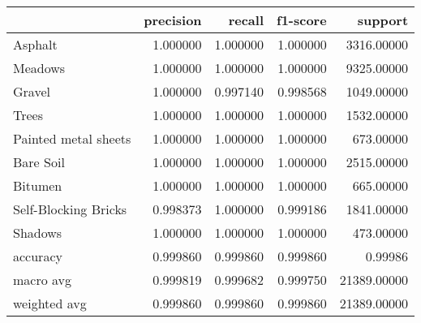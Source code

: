 \begin{tabular}{lrrrr}
\toprule
{} &  precision &    recall &  f1-score &      support \\
\midrule
Asphalt              &   1.000000 &  1.000000 &  1.000000 &   3316.00000 \\
Meadows              &   1.000000 &  1.000000 &  1.000000 &   9325.00000 \\
Gravel               &   1.000000 &  0.997140 &  0.998568 &   1049.00000 \\
Trees                &   1.000000 &  1.000000 &  1.000000 &   1532.00000 \\
Painted metal sheets &   1.000000 &  1.000000 &  1.000000 &    673.00000 \\
Bare Soil            &   1.000000 &  1.000000 &  1.000000 &   2515.00000 \\
Bitumen              &   1.000000 &  1.000000 &  1.000000 &    665.00000 \\
Self-Blocking Bricks &   0.998373 &  1.000000 &  0.999186 &   1841.00000 \\
Shadows              &   1.000000 &  1.000000 &  1.000000 &    473.00000 \\
accuracy             &   0.999860 &  0.999860 &  0.999860 &      0.99986 \\
macro avg            &   0.999819 &  0.999682 &  0.999750 &  21389.00000 \\
weighted avg         &   0.999860 &  0.999860 &  0.999860 &  21389.00000 \\
\bottomrule
\end{tabular}
